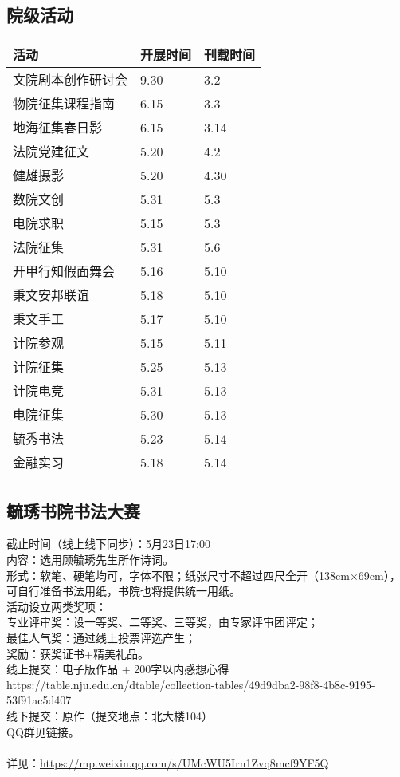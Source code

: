 \documentclass[letterpaper, 12pt]{article}
\begin{document}
\begin{multicols}{2}
\section{院级活动}
\begin{tabular}{|>{\centering\arraybackslash}m{}|m{}|m{}|}
\hline
    活动 & 开展时间 & 刊载时间\\
    \hline\hline
    文院剧本创作研讨会 & 9.30 & 3.2\\
    物院征集课程指南 & 6.15 & 3.3\\
    地海征集春日影 & 6.15 & 3.14\\
    法院党建征文 & 5.20 & 4.2\\
    健雄摄影 & 5.20 & 4.30\\
    数院文创 & 5.31 & 5.3\\
    电院求职 & 5.15 & 5.3\\
    法院征集 & 5.31 & 5.6\\
    开甲行知假面舞会 & 5.16 & 5.10\\
    秉文安邦联谊 & 5.18 & 5.10\\
    秉文手工 & 5.17 & 5.10\\
    计院参观 & 5.15 & 5.11\\
    计院征集 & 5.25 & 5.13\\
    计院电竞 & 5.31 & 5.13\\
    电院征集 & 5.30 & 5.13\\
    毓秀书法 & 5.23 & 5.14\\
    金融实习 & 5.18 & 5.14\\
    \hline
\end{tabular}
\subsection{毓琇书院书法大赛} %
截止时间（线上线下同步）：5月23日17:00
\\内容：选用顾毓琇先生所作诗词。
\\形式：软笔、硬笔均可，字体不限；纸张尺寸不超过四尺全开（138cm×69cm），可自行准备书法用纸，书院也将提供统一用纸。
\\活动设立两类奖项：
\\专业评审奖：设一等奖、二等奖、三等奖，由专家评审团评定；
\\最佳人气奖：通过线上投票评选产生；
\\奖励：获奖证书+精美礼品。
\\线上提交：电子版作品 + 200字以内感想心得
\\https://table.nju.edu.cn/dtable/collection-tables/49d9dba2-98f8-4b8c-9195-53f91ac5d407
\\线下提交：原作（提交地点：北大楼104）
\\QQ群见链接。
\\
\\详见：\url{https://mp.weixin.qq.com/s/UMcWU5Irn1Zvq8mcf9YF5Q}


\end{multicols}
\end{document}
